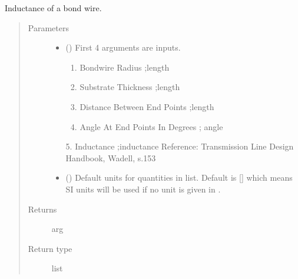 \documentclass[letterpaper,10pt,english]{sphinxmanual}
\begin{document}
\begin{fulllineitems}
\label{\detokenize{components:components.L_BondWire}}
Inductance of a bond wire.
\begin{quote}\begin{description}
\item[{Parameters}] \leavevmode\begin{itemize}
\item {} 
 () \textendash{} 
First 4 arguments are inputs.
\begin{enumerate}
%
\item {} 
Bondwire Radius ;length

\item {} 
Substrate Thickness ;length

\item {} 
Distance Between End Points ;length

\item {} 
Angle At End Points In Degrees ; angle

\end{enumerate}

5. Inductance ;inductance
Reference:  Transmission Line Design Handbook, Wadell, s.153


\item {} 
 (\sphinxstyleliteralemphasis{\sphinxupquote{, }}) \textendash{} Default units for quantities in  list. Default is {[}{]} which means SI units will be used if no unit is given in .

\end{itemize}

\item[{Returns}] \leavevmode
arg

\item[{Return type}] \leavevmode
list

\end{description}\end{quote}

\end{fulllineitems}
\end{document}
